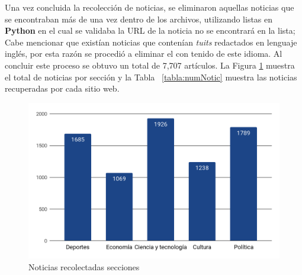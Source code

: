 Una vez concluida la recolección de noticias, se eliminaron aquellas noticias que se encontraban más de una vez dentro de los archivos, utilizando listas en \textbf{Python} en el cual se validaba la URL de la noticia no se encontrará en la lista; Cabe mencionar que existían noticias que contenían \textit{tuits} redactados en lenguaje inglés, por esta razón se procedió a eliminar el con tenido de este idioma. Al concluir este proceso se obtuvo un total de 7,707 artículos. La Figura  \ref{fig:cp5:secciones} muestra el total de noticias por sección y la Tabla \ \ref{tabla:numNotic} muestra las noticias recuperadas por cada sitio web.




\begin{figure}[h]
  \centering
  \includegraphics[scale=.32]{imagenes/Capitulo5/seccionesCr.png}
  \caption{Noticias recolectadas secciones}
  \label{fig:cp5:secciones}
\end{figure}


%
%

